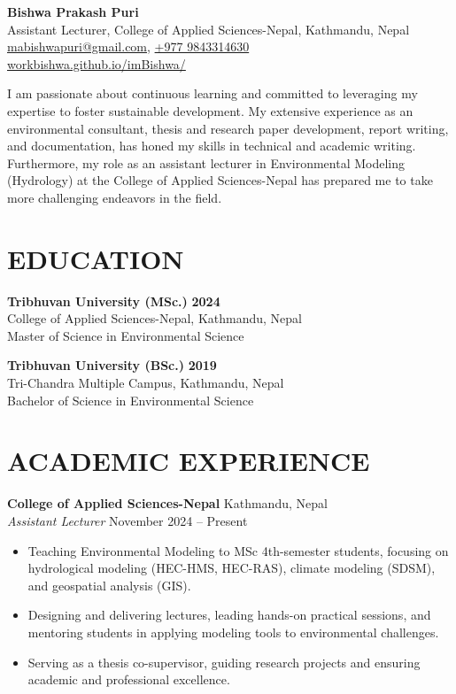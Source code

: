 \documentclass[a4paper, 11pt]{extarticle}
\begin{document}
\begin{center}
\textbf{\huge Bishwa Prakash Puri}\\[4pt] 
Assistant Lecturer, College of Applied Sciences-Nepal, Kathmandu, Nepal\\
\href{mailto:mabishwapuri@gmail.com}{mabishwapuri@gmail.com}, 
\href{tel:+9779843314630}{+977 9843314630} \\
\href{https://workbishwa.github.io/imBishwa/}{workbishwa.github.io/imBishwa/}

\end{center}

I am passionate about continuous learning and committed to leveraging my expertise to foster sustainable development. My extensive experience as an environmental consultant, thesis and research paper development, report writing, and documentation, has honed my skills in technical and academic writing. Furthermore, my role as an assistant lecturer in Environmental Modeling (Hydrology) at the College of Applied Sciences-Nepal has prepared me to take more challenging endeavors in the field.


\section*{EDUCATION}

\textbf{Tribhuvan University (MSc.)} \hfill \textbf{2024}\\[2pt] 
College of Applied Sciences-Nepal, Kathmandu, Nepal\\
Master of Science in Environmental Science

\vspace{5pt}

\noindent
\textbf{Tribhuvan University (BSc.)} \hfill \textbf{2019}\\[2pt] 
Tri-Chandra Multiple Campus, Kathmandu, Nepal\\
Bachelor of Science in Environmental Science

\vspace{5pt}

\section*{ACADEMIC EXPERIENCE}
\noindent
\textbf{College of Applied Sciences-Nepal} \hfill Kathmandu, Nepal\\[2pt] 
\textit{Assistant Lecturer} \hfill November 2024 -- Present 
\begin{itemize}
    \item Teaching Environmental Modeling to MSc 4th-semester students, focusing on hydrological modeling (HEC-HMS, HEC-RAS), climate modeling (SDSM), and geospatial analysis (GIS).
    \item Designing and delivering lectures, leading hands-on practical sessions, and mentoring students in applying modeling tools to environmental challenges.
    \item Serving as a thesis co-supervisor, guiding research projects and ensuring academic and professional excellence.
\end{itemize}
\end{document}
